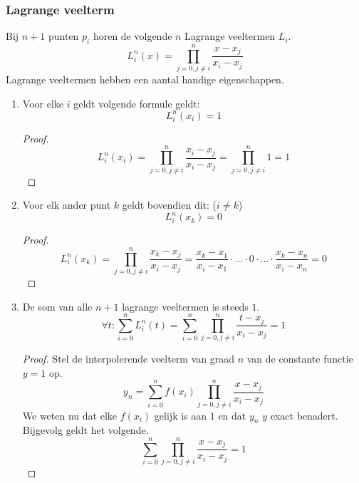 \documentclass[tmi_notities.tex]{subfiles}
\begin{document}
\subsubsection{Lagrange veelterm}
Bij $n+1$ punten $p_i$ horen de volgende $n$ Lagrange veeltermen $L_i$.
\[
L_{i}^{n}(x) = \prod_{j=0, j \neq i}^{n} \frac{x-x_{j}}{x_{i}-x_{j}}
\]
Lagrange veeltermen hebben een aantal handige eigenschappen.
\begin{enumerate}
\item Voor elke $i$ geldt volgende formule geldt:
\[
L_{i}^{n}(x_i) = 1
\]
\begin{proof}

\[
L_{i}^{n}(x_i)
= \prod_{j=0, j \neq i}^{n} \frac{x_i-x_{j}}{x_{i}-x_{j}}
= \prod_{j=0, j \neq i}^{n} 1
= 1
\]
\end{proof}
\item Voor elk ander punt $k$ geldt bovendien dit: ($i\neq k$)
\[
L_i^{n}(x_k) = 0
\]
\begin{proof}
\[
L_{i}^{n}(x_k)
= \prod_{j=0, j \neq i}^{n} \frac{x_k-x_{j}}{x_{i}-x_{j}}
= \frac{x_k-x_{1}}{x_{i}-x_{1}}\cdot \ldots \cdot 0 \cdot \ldots \cdot \frac{x_k-x_{n}}{x_{i}-x_{n}}
= 0
\]
\end{proof}
\item De som van alle $n+1$ lagrange veeltermen is steeds $1$.
\[
\forall t: \sum_{i=0}^{n}L_i^{n}(t) = \sum_{i=0}^{n}\prod_{j=0, j \neq i}^{n} \frac{t-x_{j}}{x_{i}-x_{j}} = 1
\]
\begin{proof}
Stel de interpolerende veelterm van graad $n$ van de constante functie $y=1$ op.
\[
y_n = \sum_{i=0}^{n} f(x_i) \prod_{j=0,j\neq i}^{n}\frac{x-x_j}{x_i-x_j}
\]
We weten nu dat elke $f(x_i)$ gelijk is aan $1$ en dat $y_n$ $y$ exact benadert.
Bijgevolg geldt het volgende.
\[
\sum_{i=0}^{n}\prod_{j=0,j\neq i}^{n}\frac{x-x_j}{x_i-x_j} = 1
\]
\end{proof}

\end{enumerate}
\end{document}
